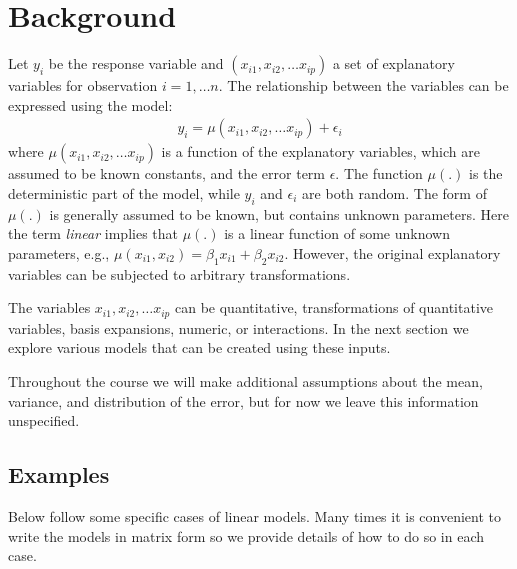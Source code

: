 \section{Background}
Let $y_i$ be the response variable and $(x_{i1}, x_{i2}, \ldots x_{ip})$ a set of explanatory variables for observation $i=1, \ldots n$. The relationship between the variables can be expressed using the model:
\begin{align}
y_i = \mu(x_{i1}, x_{i2}, \ldots x_{ip}) + \epsilon_i \label{LM}
\end{align}
where $\mu(x_{i1}, x_{i2}, \ldots x_{ip})$ is a function of the explanatory variables, which are assumed to be known constants, and the error term $\epsilon$. 
The function $\mu(.)$ is the deterministic part of the model, while $y_i$ and $\epsilon_i$ are both random. The form of $\mu(.)$ is generally assumed to be known, but contains unknown parameters.  Here the term {\it linear} implies that $\mu(.)$ is a linear function of some unknown parameters,
e.g.,  $\mu(x_{i1},x_{i2}) = \beta_1 x_{i1} + \beta_2 x_{i2}$. However, the original explanatory variables can be subjected to arbitrary transformations.

The variables $x_{i1}, x_{i2}, \ldots x_{ip}$ can be quantitative, transformations of quantitative variables, basis expansions, numeric, or interactions. In the next section we explore various models that can be created using these inputs. 


Throughout the course we will make additional assumptions about the mean, variance, and distribution of the error, but for now we leave this information unspecified. 

\subsection{Examples}

Below follow some specific cases of linear models. Many times it is convenient to write the models in matrix form so we provide details of how to do so in each case. 




